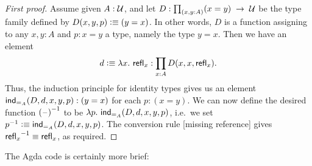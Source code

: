 \begin{proof}[First proof]
  Assume given $A:\mathcal{U}$, and
  let $D:{\textstyle\prod_{(x,y:A)}}(x= y) \; \to \; \mathcal{U}$ be the type family defined by $D(x,y,p)\vcentcolon\equiv (y= x)$.
  In other words, $D$ is a function assigning to any $x,y:A$ and $p:x=y$ a type, namely the type $y=x$.
  Then we have an element
  \begin{equation*}
    d\defeq \lambda x.\ \refl{x}:\prod_{x:A} D(x,x,\refl{x}).
  \end{equation*}
  Thus, the induction principle for identity types gives us an element
  $\mathsf{ind}_{=_{A}}(D,d,x,y,p): (y= x)$
  for each $p:(x= y)$.
  We can now define the desired function $\mathord{{(\mathord{\hspace{1pt}\text{--}\hspace{1pt}})}^{-1}}$ to be 
  $\lambda p.\ \mathsf{ind}_{=_{A}}(D,d,x,y,p)$, 
  i.e.\ we set 
  $\mathord{{p}^{-1}} \vcentcolon\equiv \mathsf{ind}_{=_{A}}(D,d,x,y,p)$.
  The conversion rule [missing reference] %
  gives $\mathord{{\mathsf{refl}_{x}}^{-1}}\equiv \mathsf{refl}_{x}$, as required.
\end{proof}
The Agda code is certainly more brief: 
